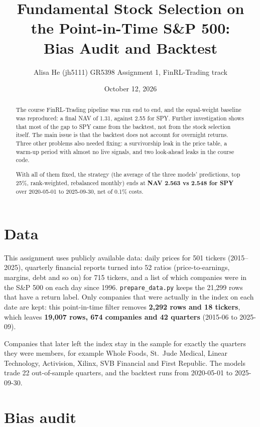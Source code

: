 \documentclass[10pt]{article}
\title{\vspace{-2.2em}\large\textbf{Fundamental Stock Selection on the Point-in-Time S\&P 500:\\ Bias Audit and Backtest}\vspace{-0.6em}}
\author{\normalsize Alisa He (jh5111) \quad GR5398 Assignment 1, FinRL-Trading track}
\date{\normalsize October 12, 2026\vspace{-1.2em}}
\begin{document}
\maketitle

\begin{abstract}
\noindent The course FinRL-Trading pipeline was run end to end, and the equal-weight baseline was
reproduced: a final NAV of 1.31, against 2.55 for SPY. Further investigation shows that most of the
gap to SPY came from the backtest, not from the stock selection itself. The main issue is that the
backtest does not account for overnight returns. Three other problems also needed fixing: a
survivorship leak in the price table, a warm-up period with almost no live signals, and two look-ahead
leaks in the course code.

\smallskip
\noindent With all of them fixed, the strategy (the average of the three models' predictions, top
25\%, rank-weighted, rebalanced monthly) ends at \textbf{NAV 2.563 vs 2.548 for SPY} over 2020-05-01
to 2025-09-30, net of 0.1\% costs.
\end{abstract}

\section{Data}
This assignment uses publicly available data: daily prices for 501 tickers (2015--2025), quarterly
financial reports turned into 52 ratios (price-to-earnings, margins, debt and so on) for 715 tickers,
and a list of which companies were in the S\&P 500 on each day since 1996. \texttt{prepare\_data.py}
keeps the 21,299 rows that have a return label. Only companies that were actually in the index on each
date are kept: this point-in-time filter removes \textbf{2,292 rows and 18 tickers}, which leaves
\textbf{19,007 rows, 674 companies and 42 quarters} (2015-06 to 2025-09).

Companies that later left the index stay in the sample for exactly the quarters they were members, for
example Whole Foods, St.\ Jude Medical, Linear Technology, Activision, Xilinx, SVB Financial and First
Republic. The models trade 22 out-of-sample quarters, and the backtest runs from 2020-05-01 to
2025-09-30.

\section{Bias audit}
\end{document}
